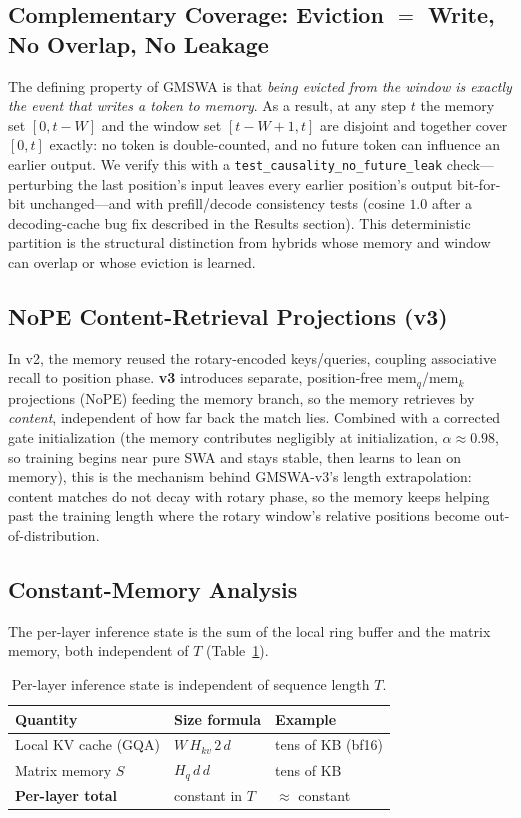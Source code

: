 \documentclass[letterpaper]{article} %
\begin{document}
\subsection{Complementary Coverage: Eviction $=$ Write, No Overlap, No Leakage}
The defining property of GMSWA is that \emph{being evicted from the window is exactly the event that writes a token to memory}. As a result, at any step $t$ the memory set $[0, t{-}W]$ and the window set $[t{-}W{+}1, t]$ are disjoint and together cover $[0, t]$ exactly: no token is double-counted, and no future token can influence an earlier output. We verify this with a \texttt{test\_causality\_no\_future\_leak} check---perturbing the last position's input leaves every earlier position's output bit-for-bit unchanged---and with prefill/decode consistency tests (cosine $1.0$ after a decoding-cache bug fix described in the Results section). This deterministic partition is the structural distinction from hybrids whose memory and window can overlap or whose eviction is learned.

\subsection{NoPE Content-Retrieval Projections (v3)}
In v2, the memory reused the rotary-encoded keys/queries, coupling associative recall to position phase. \textbf{v3} introduces separate, position-free $\mathrm{mem}_q$/$\mathrm{mem}_k$ projections (NoPE) feeding the memory branch, so the memory retrieves by \emph{content}, independent of how far back the match lies. Combined with a corrected gate initialization (the memory contributes negligibly at initialization, $\alpha \approx 0.98$, so training begins near pure SWA and stays stable, then learns to lean on memory), this is the mechanism behind GMSWA-v3's length extrapolation: content matches do not decay with rotary phase, so the memory keeps helping past the training length where the rotary window's relative positions become out-of-distribution.

\subsection{Constant-Memory Analysis}
The per-layer inference state is the sum of the local ring buffer and the matrix memory, both independent of $T$ (Table~\ref{tab:mem}).

\begin{table}[t]
\centering
\caption{Per-layer inference state is independent of sequence length $T$.}
\label{tab:mem}
\begin{tabular}{lll}
\toprule
Quantity & Size formula & Example \\
\midrule
Local KV cache (GQA) & $W\,H_{kv}\,2\,d$ & tens of KB (bf16) \\
Matrix memory $S$    & $H_q\,d\,d$      & tens of KB \\
\textbf{Per-layer total} & constant in $T$ & $\approx$ constant \\
\bottomrule
\end{tabular}
\end{table}
\end{document}
